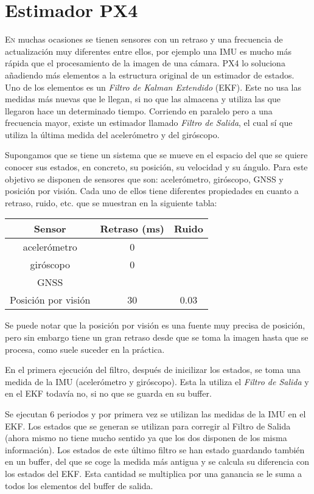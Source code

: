 \chapter{Estimador PX4}\label{chp-01}

\lettrine[lraise=-0.1, lines=2, loversize=0.2]{E}{n} muchas ocasiones se tienen sensores con un retraso y una frecuencia de actualización muy diferentes entre ellos, por ejemplo una IMU es mucho más rápida que el procesamiento de la imagen de una cámara. PX4 lo soluciona añadiendo más elementos a la estructura original de un estimador de estados. Uno de los elementos es un \textit{Filtro de Kalman Extendido} (EKF). Este no usa las medidas más nuevas que le llegan, si no que las almacena y utiliza las que llegaron hace un determinado tiempo. Corriendo en paralelo pero a una frecuencia mayor, existe un estimador llamado \textit{Filtro de Salida}, el cual sí que utiliza la última medida del acelerómetro y del giróscopo. 

Supongamos que se tiene un sistema que se mueve en el espacio del que se quiere conocer sus estados, en concreto, su posición, su velocidad y su ángulo. Para este objetivo se disponen de sensores que son: acelerómetro, giróscopo, GNSS y posición por visión. Cada uno de ellos tiene diferentes propiedades en cuanto a retraso, ruido, etc. que se muestran en la siguiente tabla: 

\begin{tabular}{|c|c|c|}
Sensor			& Retraso (ms) 	& Ruido 	\\ \hline 
acelerómetro 		& 0 		& 	      	\\ 
giróscopo 		& 0 		& 	      	\\ 
GNSS      		& 		& 	      	\\ %
Posición por visión 	& 30 		& 0.03 	
\end{tabular}

Se puede notar que la posición por visión es una fuente muy precisa de posición, pero sin embargo tiene un gran retraso desde que se toma la imagen hasta que se procesa, como suele suceder en la práctica. 

En el primera ejecución del filtro, después de inicilizar los estados, se toma una medida de la IMU (acelerómetro y giróscopo). Esta la utiliza el \textit{Filtro de Salida} y en el EKF todavía no, si no que se guarda en su buffer. 

Se ejecutan 6 periodos y por primera vez se utilizan las medidas de la IMU en el EKF. Los estados que se generan se utilizan para corregir al Filtro de Salida (ahora mismo no tiene mucho sentido ya que los dos disponen de los misma información). Los estados de este último filtro se han estado guardando también en un buffer, del que se coge la medida más antigua y se calcula su diferencia con los estados del EKF. Esta cantidad se multiplica por una ganancia se le suma a todos los elementos del buffer de salida.  

